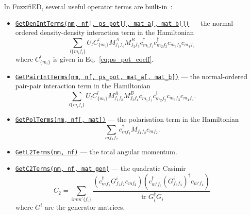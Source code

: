 \documentclass{timesjhep}
\begin{document}
In FuzzifiED, several useful operator terms are built-in~:
\begin{itemize}
    \item \href{https://docs.fuzzified.world/models/\#FuzzifiED.GetDenIntTerms}{\lstinline|GetDenIntTerms(nm, nf[, ps_pot][, mat_a[, mat_b]])|} --- the normal-ordered den\-sity-density interaction term in the Hamiltonian 
    \begin{equation}
        \sum_{l\{m_if_i\}}U_lC^l_{\{m_i\}}M^A_{f_1f_4}M^B_{f_2f_3}c^\dagger_{m_1f_1}c^\dagger_{m_2f_2}c_{m_3f_3}c_{m_4f_4}
    \end{equation}
    where $C^l_{\{m_i\}}$ is given in Eq.~\eqref{eq:ps_pot_coeff}.
    \item \href{https://docs.fuzzified.world/models/\#FuzzifiED.GetPairIntTerms}{\lstinline|GetPairIntTerms(nm, nf, ps_pot, mat_a[, mat_b])|} --- the normal-ordered pair-pair interaction term in the Hamiltonian 
    \begin{equation}
        \sum_{l\{m_if_i\}}U_lC^l_{\{m_i\}}M^A_{f_1f_2}M^B_{f_3f_4}c^\dagger_{m_1f_1}c^\dagger_{m_2f_2}c_{m_3f_3}c_{m_4f_4}.
    \end{equation}
    \item \href{https://docs.fuzzified.world/models/\#FuzzifiED.GetPolTerms-Tuple{Int64,\%20Int64,\%20Matrix{\%3C:Number}}}{\lstinline|GetPolTerms(nm, nf[, mat])|} --- the polarisation term in the Hamiltonian 
    \begin{equation}
        \sum_{mf_1f_2}c^\dagger_{mf_1}M_{f_1f_2}c_{mf_2}.
    \end{equation}
    \item \href{https://docs.fuzzified.world/models/\#FuzzifiED.GetL2Terms-Tuple{Int64,\%20Int64}}{\lstinline|GetL2Terms(nm, nf)|} --- the total angular momentum. 
    \item \href{https://docs.fuzzified.world/models/\#FuzzifiED.GetC2Terms-Tuple{Int64,\%20Int64,\%20Vector{\%3C:AbstractMatrix{\%3C:Number}}}}{\lstinline|GetC2Terms(nm, nf, mat_gen)|} --- the quadratic Casimir 
    \begin{equation}
        C_2=\sum_{imm'\{f_i\}}\frac{(c^\dagger_{mf_1}G^i_{f_1f_2}c_{mf_2})(c^\dagger_{m'f_3}(G^i_{f_3f_4})^\dagger c_{m'f_4})}{\operatorname{tr}G_i^\dagger G_i}
    \end{equation}
    where $G^i$ are the generator matrices.
\end{itemize}
\end{document}
